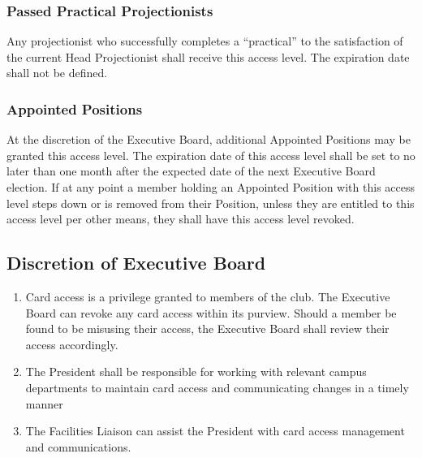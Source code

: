\documentclass[12pt,letterpaper,oneside]{book}
\begin{document}
\subsubsection{Passed Practical Projectionists}
Any projectionist who successfully completes a ``practical'' to the satisfaction of the current Head Projectionist shall receive this access level. The expiration date shall not be defined.

\subsubsection{Appointed Positions}
At the discretion of the Executive Board, additional Appointed Positions may be granted this access level. The expiration date of this access level shall be set to no later than one month after the expected date of the next Executive Board election. If at any point a member holding an Appointed Position with this access level steps down or is removed from their Position, unless they are entitled to this access level per other means, they shall have this access level revoked.

\subsection{Discretion of Executive Board}
\begin{enumerate}
    \item Card access is a privilege granted to members of the club. The
        Executive Board can revoke any card access within its purview.
        Should a member be found to be misusing their
        access, the Executive Board shall review their access accordingly.
    \item The President shall be responsible for working with relevant campus
        departments to maintain card access and communicating changes in a timely manner
    \item The Facilities Liaison can assist the President with card access
        management and communications.
\end{enumerate}
\end{document}
